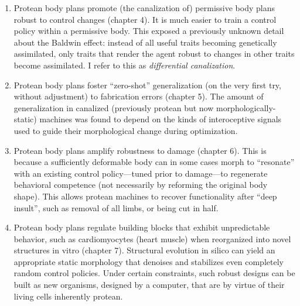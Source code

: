 \begin{enumerate}
    \item Protean body plans promote (the canalization of) permissive body plans robust to control changes (chapter 4).
    It is much easier to train a control policy within a permissive body. 
    This exposed a previously unknown detail about the Baldwin effect: instead of all useful traits becoming genetically assimilated, only traits that render the agent robust to changes in other traits become assimilated. 
    I refer to this as \textit{differential canalization}.
    
    \item Protean body plans foster ``zero-shot'' generalization (on the very first try, without adjustment) to fabrication errors (chapter 5).
    The amount of generalization in canalized (previously protean but now morphologically-static) machines was found to depend on the kinds of interoceptive signals used to guide their morphological change during optimization.
    
    \item Protean body plans amplify robustness to damage (chapter 6).
    This is because a sufficiently deformable body can in some cases morph to ``resonate'' with an existing control policy---tuned prior to damage---to regenerate behavioral competence (not necessarily by reforming the original body shape).
    This allows protean machines to recover functionality after ``deep insult'', such as removal of all limbs, or being cut in half.
    
    \item Protean body plans regulate building blocks that exhibit unpredictable behavior, such as cardiomyocytes (heart muscle) when reorganized into novel structures in vitro (chapter 7).
    Structural evolution in silico can yield an appropriate static morphology that denoises and stabilizes even completely random control policies.
    Under certain constraints, such robust designs can be built as new organisms, designed by a computer, that are by virtue of their living cells inherently protean.
    
    
\end{enumerate}

